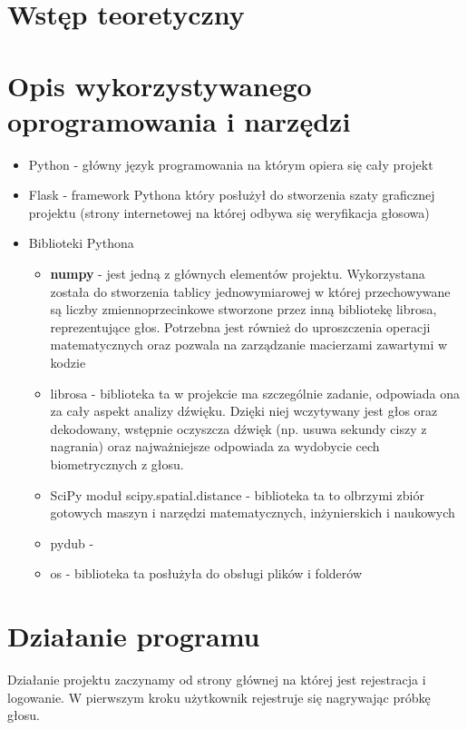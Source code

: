 \section{Wstęp teoretyczny}



\section{Opis wykorzystywanego oprogramowania i narzędzi}
\begin{itemize}
	\item Python - główny język programowania na którym opiera się cały projekt
	\item Flask - framework Pythona który posłużył do stworzenia szaty graficznej projektu (strony internetowej na której odbywa się weryfikacja głosowa)
	\item Biblioteki Pythona
	\begin{itemize}
		\item \textbf{numpy} - jest jedną z głównych elementów projektu. Wykorzystana została do stworzenia tablicy jednowymiarowej w której przechowywane są liczby zmiennoprzecinkowe stworzone przez inną bibliotekę librosa, reprezentujące głos. Potrzebna jest również do uproszczenia operacji matematycznych oraz pozwala na zarządzanie macierzami zawartymi w kodzie
		\item librosa - biblioteka ta w projekcie ma szczególnie zadanie, odpowiada ona za cały aspekt analizy dźwięku. Dzięki niej wczytywany jest głos oraz dekodowany, wstępnie oczyszcza dźwięk (np. usuwa sekundy ciszy z nagrania) oraz najważniejsze odpowiada za wydobycie cech biometrycznych z głosu.
		\item SciPy  moduł scipy.spatial.distance - biblioteka ta to olbrzymi zbiór gotowych maszyn i narzędzi matematycznych, inżynierskich i naukowych
		\item pydub - 
		\item os - biblioteka ta posłużyła do obsługi plików i folderów
		
	\end{itemize}	
\end{itemize}	



\section{Działanie programu}
Działanie projektu zaczynamy od strony głównej na której jest rejestracja i logowanie. W pierwszym kroku użytkownik rejestruje się nagrywając próbkę głosu. 

